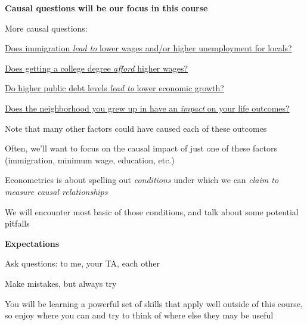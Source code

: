 \documentclass[11pt, aspectratio=169]{beamer}
\newenvironment{wideitemize}{\itemize\addtolength{\itemsep}{5pt}}{\enditemize}
\newenvironment{wideenumerate}{\enumerate\addtolength{\itemsep}{5pt}}{\endenumerate}
\begin{document}
\begin{frame}{\bf \large Causal questions will be our focus in this course}
	\begin{wideitemize}
		\item[] More causal questions:
\begin{wideenumerate}
	\item \href{http://davidcard.berkeley.edu/papers/mariel-impact.pdf}{Does immigration \emph{lead to} lower wages and/or higher unemployment for locals? }
	
	\item \href{http://davidcard.berkeley.edu/papers/causal_educ_earnings.pdf}{Does getting a college degree \emph{afford} higher wages? }
	
	\item \href{https://www.imf.org/external/pubs/ft/wp/2014/wp1434.pdf}{Do higher public debt levels \emph{lead to} lower economic growth? }
	\item \href{https://academic.oup.com/qje/article/133/3/1107/4850660}{ Does the
		neighborhood you grew up in have an \emph{impact} on your life outcomes?}
\end{wideenumerate}

\pause 

			\item Note that many other factors could have caused each of these outcomes
			\item Often, we’ll want to focus on the causal impact of just one of these factors (immigration, minimum wage, education, etc.)
			\item Econometrics is about spelling out \textit{conditions} under which we can \textit{claim to measure causal relationships}
			\item We will encounter most basic of those conditions, and talk about some potential pitfalls

	\end{wideitemize}
\end{frame}

\begin{frame}{\bf \large Expectations}
	\begin{wideitemize}
		\item Ask questions: to me, your TA, each other
		\item Make mistakes, but always try
		\item You will be learning a powerful set of skills that apply well outside of this course, so enjoy where you can and try to think of where else they may be useful
	\end{wideitemize}
\end{frame}
\end{document}
